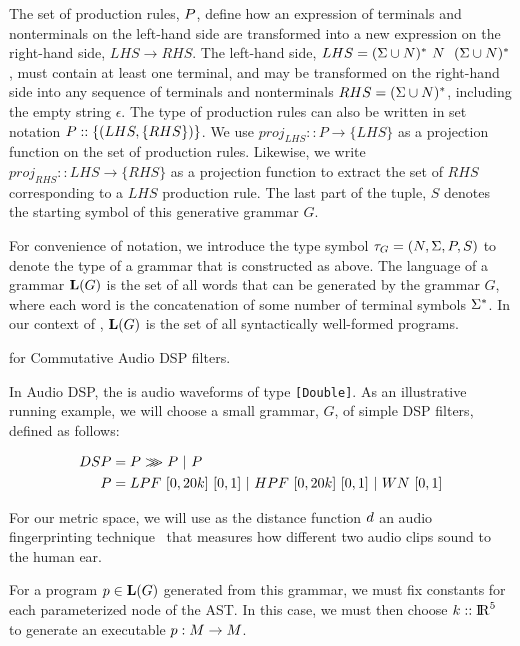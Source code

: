 The set of production rules, $P$, define how an expression of terminals and nonterminals on the left-hand side are transformed into a new expression on the right-hand side, $LHS \to RHS$.
The left-hand side, $LHS = (\Sigma \cup N)^{*} \ N \ \ (\Sigma \cup N)^{*}$, must contain at least one terminal, 
  and may be transformed on the right-hand side into any sequence of terminals and nonterminals $RHS = (\Sigma \cup N)^{*}$, including the empty string $\epsilon$.
The type of production rules can also be written in set notation $P :: \{(LHS,\{RHS\})\}$.
We use $proj_{LHS} :: P \to \{LHS\}$ as a projection function on the set of production rules.
Likewise, we write $proj_{RHS} :: LHS \to \{RHS\}$ as a projection function to extract the set of $RHS$ corresponding to a $LHS$ production rule.
The last part of the tuple, $S$ denotes the starting symbol of this generative grammar $G$.

For convenience of notation, we introduce the type symbol $\tau_{G} = (N,\Sigma,P,S)$ to denote the type of a grammar that is constructed as above.
The language of a grammar $\mathbf{L}(G)$ is the set of all words that can be generated by the grammar $G$, where each word is the concatenation of some number of terminal symbols $\Sigma^{*}$.
In our context of \approximatePBE, $\mathbf{L}(G)$ is the set of all syntactically well-formed programs.


\begin{exmp}
\approximatePBE for Commutative Audio DSP filters.

In Audio DSP, the \exampleDomain is audio waveforms of type \texttt{[Double]}.
As an illustrative running example, we will choose a small grammar, $G$, of simple DSP filters, defined as follows:

\begin{align*}
DSP &= P \arrComp P\ |\ P \\
P   & = LPF \ [0,20k] \ [0,1] \ |\ HPF \ [0,20k] \ [0,1] \ |\ WN \ [0,1]
\end{align*}

For our metric space, we will use as the distance function ${d}$ an audio fingerprinting technique~\cite{SantolucitoFARM} that measures how different two audio clips sound to the human ear.

For a program $p \in \mathbf{L}(G)$ generated from this grammar, we must fix constants for each parameterized node of the AST.
In this case, we must then choose ${k} :: {\rm I\!R}^{5}$ to generate an executable $p:M \to M$. 

\end{exmp}

